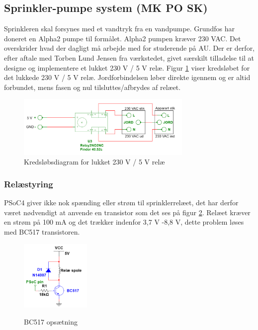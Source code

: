 
\subsection{Sprinkler-pumpe system (MK PO SK)}

Sprinkleren skal forsynes med et vandtryk fra en vandpumpe. Grundfos har doneret en Alpha2 pumpe til formålet. Alpha2 pumpen kræver 230 VAC. Det overskrider hvad der dagligt må arbejde med for studerende på AU. Der er derfor, efter aftale med Torben Lund Jensen fra værkstedet, givet særskilt tilladelse til at designe og implementere et lukket 230 V / 5 V relæ. Figur \ref{lab:Relay_box} viser kredsløbet for det lukkede 230 V / 5 V relæ. Jordforbindelsen løber direkte igennem og er altid forbundet, mens fasen og nul tilsluttes/afbrydes af relæet.  

\begin{figure}[H]
  \centering
    \includegraphics[width=0.75\textwidth]{Billeder/230VAC_KREDS}
    \caption{Kredsløbsdiagram for lukket 230 V / 5 V relæ}
    \label{lab:Relay_box}
\end{figure}

\subsubsection{Relæstyring}

PSoC4 giver ikke nok spænding eller strøm til sprinklerrelæet, det har derfor været nødvendigt at anvende en transistor som det ses på figur \ref{lab:BC517}. Relæet kræver en strøm på 100 mA og det trækker indenfor 3,7 V -8,8 V, dette problem løses med BC517 transistoren. 

\begin{figure}[H] \centering
{\includegraphics[width=0.3\textwidth]{Billeder/BC517}}
\caption{BC517 opsætning}
\label{lab:BC517}
\raggedright
\end{figure} 

